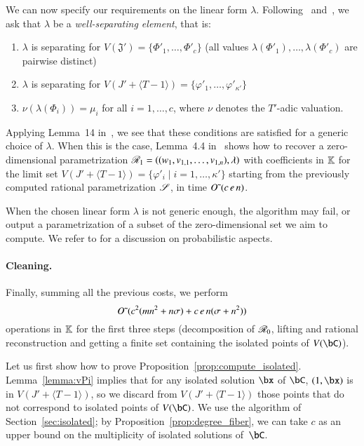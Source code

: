 \documentclass[amsthm]{elsart}
\begin{document}
We can now specify our requirements on the linear form $\lambda$.
Following~\cite{RRS} and~\cite{SaSc16}, we ask that $\lambda$ be a
{\em well-separating element}, that is:
\begin{enumerate}
\item $\lambda$ is separating for $V(\mathfrak{J}')=\{\Phi'_1,\dots,\Phi'_c\}$ (all values $\lambda(\Phi'_1),\dots,\lambda(\Phi'_c)$ are pairwise distinct)
\item $\lambda$ is separating for $V(J' + \langle T-1\rangle) = \{ \varphi'_1,\dots,\varphi'_{\kappa'}\}$
\item $\nu(\lambda(\Phi_i)) = \mu_i$ for all $i=1,\dots,c$, where $\nu$ denotes the $T'$-adic valuation.
\end{enumerate}
Applying Lemma~14 in~\cite[Section 3]{SaSc16}, we see that these
conditions are satisfied for a generic choice of $\lambda$. When this
is the case, Lemma~4.4 in~\cite{RRS} shows how to recover a
zero-dimensional parametrization
$\mathscr{R}_1=((w_1,v_{1,1},\dots,v_{1,n}),\lambda)$ with coefficients in
$\mathbb{K}$ for the limit set $V(J' + \langle T-1\rangle) =\{\varphi'_i \mid
i=1,\dots,{\kappa'}\}$ starting from the previously computed rational
parametrization $\mathscr{S}$, in time ${O}{\,\tilde{ }\,}(c\,e\,n)$.

When the chosen linear form $\lambda$ is not generic enough, the
algorithm may fail, or output a parametrization of a subset of the
zero-dimensional set we aim to compute. We refer to \cite[Remark
  14]{SaSc16} for a discussion on probabilistic aspects.

\paragraph*{Cleaning.}
Finally, summing all the previous costs, we perform
$$
{O}{\,\tilde{ }\,}(c^2 (mn^2+n\sigma) + c\, e\,n (\sigma+n^2) )
$$
operations in $\mathbb{K}$ for the first three steps (decomposition of
$\mathscr{R}_0$, lifting and rational reconstruction and getting a finite
set containing the isolated points of $V(\bC)$).

Let us first show how to prove
Proposition~\ref{prop:compute_isolated}.  Lemma~\ref{lemma:vPi}
implies that for any isolated solution $\bx$ of $\bC$, $(1,\bx)$ is in
$V(J' + \langle T-1\rangle)$, so we discard from $V(J' + \langle
T-1\rangle)$ those points that do not correspond to isolated points of
$V(\bC)$. We use the algorithm of Section~\ref{sec:isolated}; by
Proposition~\ref{prop:degree_fiber}, we can take $c$ as an upper bound
on the multiplicity of isolated solutions of~$\bC$.
\end{document}
